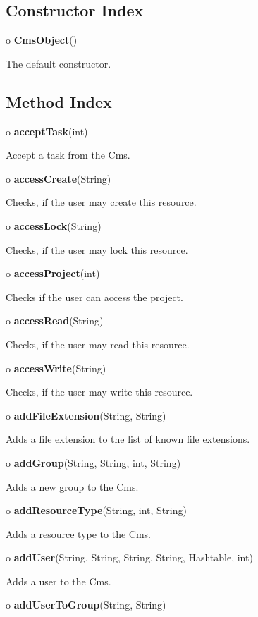 \subsection*{  Constructor Index }

\begin{description}
\item o {\bf CmsObject}()  

The default constructor. 
\end{description}

\subsection*{  Method Index }

\begin{description}
\item o {\bf acceptTask}(int)  

Accept a task from the Cms.  
\item o {\bf accessCreate}(String)  

Checks, if the user may create this resource.  
\item o {\bf accessLock}(String)  

Checks, if the user may lock this resource.  
\item o {\bf accessProject}(int)  

Checks if the user can access the project.  
\item o {\bf accessRead}(String)  

Checks, if the user may read this resource.  
\item o {\bf accessWrite}(String)  

Checks, if the user may write this resource.  
\item o {\bf addFileExtension}(String, String)  

Adds a file extension to the list of known file extensions.  
\item o {\bf addGroup}(String, String, int, String)  

Adds a new group to the Cms.  
\item o {\bf addResourceType}(String, int, String)  

Adds a resource type to the Cms.  
\item o {\bf addUser}(String, String, String, String, Hashtable, int)  

Adds a user to the Cms.  
\item o {\bf addUserToGroup}(String, String)  


\end{description}
